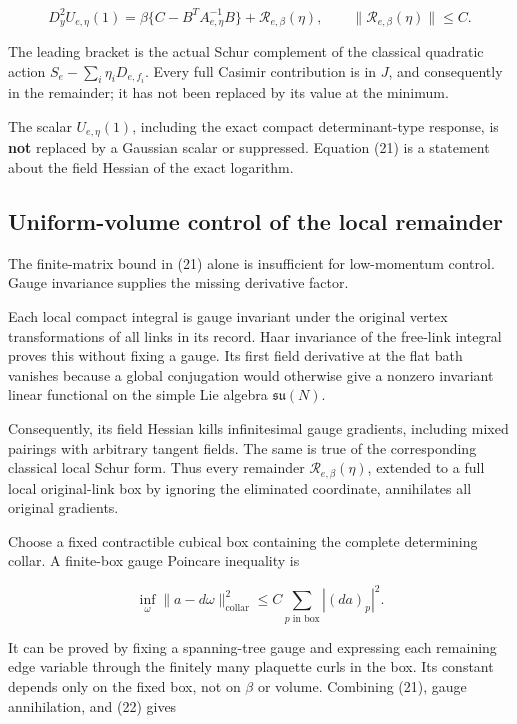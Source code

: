 \documentclass[
  11pt,
]{article}
\begin{document}
\[
 D_y^2U_{e,\eta}(1)
 =\beta\{C-B^TA_{e,\eta}^{-1}B\}
   +\mathcal R_{e,\beta}(\eta),
 \qquad \|\mathcal R_{e,\beta}(\eta)\|\le C.       \tag{21}
\]

The leading bracket is the actual Schur complement of the classical
quadratic action \(S_e-\sum_i\eta_iD_{e,f_i}\). Every full Casimir
contribution is in \(J\), and consequently in the remainder; it has not
been replaced by its value at the minimum.

The scalar \(U_{e,\eta}(1)\), including the exact compact
determinant-type response, is \textbf{not} replaced by a Gaussian scalar
or suppressed. Equation (21) is a statement about the field Hessian of
the exact logarithm.

\hypertarget{uniform-volume-control-of-the-local-remainder}{%
\subsection{Uniform-volume control of the local
remainder}\label{uniform-volume-control-of-the-local-remainder}}

The finite-matrix bound in (21) alone is insufficient for low-momentum
control. Gauge invariance supplies the missing derivative factor.

Each local compact integral is gauge invariant under the original vertex
transformations of all links in its record. Haar invariance of the
free-link integral proves this without fixing a gauge. Its first field
derivative at the flat bath vanishes because a global conjugation would
otherwise give a nonzero invariant linear functional on the simple Lie
algebra \(\mathfrak{su}(N)\).

Consequently, its field Hessian kills infinitesimal gauge gradients,
including mixed pairings with arbitrary tangent fields. The same is true
of the corresponding classical local Schur form. Thus every remainder
\(\mathcal R_{e,\beta}(\eta)\), extended to a full local original-link
box by ignoring the eliminated coordinate, annihilates all original
gradients.

Choose a fixed contractible cubical box containing the complete
determining collar. A finite-box gauge Poincare inequality is

\[
 \inf_\omega\|a-d\omega\|_{\mathrm{collar}}^2
 \le C\sum_{p\text{ in box}}|(da)_p|^2.           \tag{22}
\]

It can be proved by fixing a spanning-tree gauge and expressing each
remaining edge variable through the finitely many plaquette curls in the
box. Its constant depends only on the fixed box, not on \(\beta\) or
volume. Combining (21), gauge annihilation, and (22) gives
\end{document}
